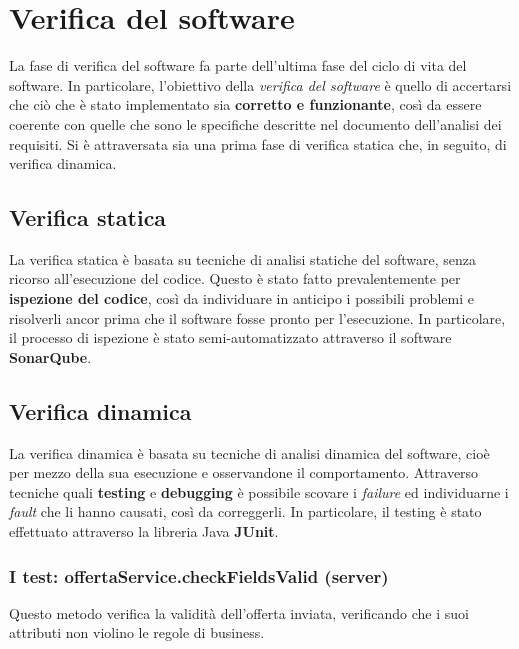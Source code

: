 
\chapter{Verifica del software}
    La fase di verifica del software fa parte dell'ultima fase del ciclo di vita del software. In particolare, l'obiettivo della \textit{verifica del software} è quello di accertarsi che ciò che è stato implementato sia \textbf{corretto e funzionante}, così da essere coerente con quelle che sono le specifiche descritte nel documento dell'analisi dei requisiti. Si è attraversata sia una prima fase di verifica statica che, in seguito, di verifica dinamica.

    \section{Verifica statica}
        La verifica statica è basata su tecniche di analisi statiche del software, senza ricorso all'esecuzione del codice. Questo è stato fatto prevalentemente per \textbf{ispezione del codice}, così da individuare in anticipo i possibili problemi e risolverli ancor prima che il software fosse pronto per l'esecuzione. In particolare, il processo di ispezione è stato semi-automatizzato attraverso il software \textbf{SonarQube}.

    \section{Verifica dinamica}
        La verifica dinamica è basata su tecniche di analisi dinamica del software, cioè per mezzo della sua esecuzione e osservandone il comportamento. Attraverso tecniche quali \textbf{testing} e \textbf{debugging} è possibile scovare i \textit{failure} ed individuarne i \textit{fault} che li hanno causati, così da correggerli. In particolare, il testing è stato effettuato attraverso la libreria Java \textbf{JUnit}.
        
        \subsection{I test: offertaService.checkFieldsValid (server)}
            Questo metodo verifica la validità dell'offerta inviata, verificando che i suoi attributi non violino le regole di business. \\
            
